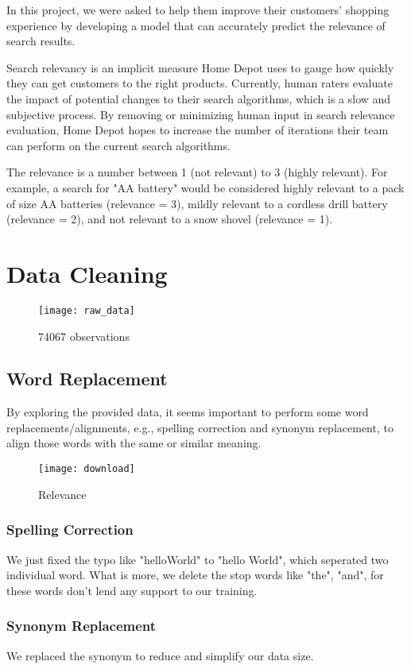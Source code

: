 \documentclass[journal]{IEEEtran}
\begin{document}
In this project, we were asked to help them improve their customers' shopping experience by developing a model that can accurately predict the relevance of search results.

Search relevancy is an implicit measure Home Depot uses to gauge how quickly they can get customers to the right products. Currently, human raters evaluate the impact of potential changes to their search algorithms, which is a slow and subjective process. By removing or minimizing human input in search relevance evaluation, Home Depot hopes to increase the number of iterations their team can perform on the current search algorithms.

The relevance is a number between 1 (not relevant) to 3 (highly relevant). For example, a search for "AA battery" would be considered highly relevant to a pack of size AA batteries (relevance = 3), mildly relevant to a cordless drill battery (relevance = 2), and not relevant to a snow shovel (relevance = 1).
\section{Data Cleaning}
\begin{figure}[htbp] 
\centering\texttt{[image: raw\_data]} 
\caption{74067 observations}\label{fig:1} 
\end{figure} 
\subsection{Word Replacement}
By exploring the provided data, it seems important to perform some word replacements/alignments, e.g., spelling correction and synonym replacement, to align those words with the same or similar meaning.
\begin{figure}[htbp] 
\centering\texttt{[image: download]} 
\caption{Relevance}\label{fig:2} 
\end{figure} 
\subsubsection{Spelling Correction}
We just fixed the typo like "helloWorld" to "hello World", which seperated two individual word. What is more, we delete the stop words like "the", "and", for these words don't lend any support to our training.
\subsubsection{Synonym Replacement}
We replaced the synonym to reduce and simplify our data size.
\end{document}
